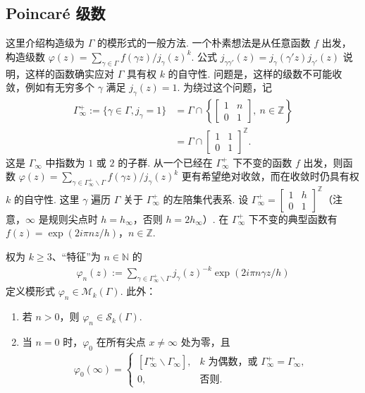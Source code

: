 \subsection{Poincaré 级数}\label{sec:modular-1-2-7}
这里介绍构造级为 $\Gamma$ 的模形式的一般方法. 一个朴素想法是从任意函数 $f$ 出发，构造级数 $\varphi(z)=\sum_{\gamma\in\Gamma}f(\gamma z)/j_\gamma(z)^k$. 公式 $j_{\gamma\gamma'}(z)=j_\gamma(\gamma'z)j_{\gamma'}(z)$ 说明，这样的函数确实应对 $\Gamma$ 具有权 $k$ 的自守性. 问题是，这样的级数不可能收敛，例如有无穷多个 $\gamma$ 满足 $j_\gamma(z)=1$. 为绕过这个问题，记
\begin{align*}
\Gamma_\infty^+:=\{\gamma\in\Gamma,j_\gamma=1\}&=\Gamma\cap\left\{\begin{bmatrix}1&n\\0&1\end{bmatrix},\ n\in\mathbb Z\right\}\\
&=\Gamma\cap\begin{bmatrix}1&1\\0&1\end{bmatrix}^{\mathbb Z}.
\end{align*}
这是 $\Gamma_\infty$ 中指数为 $1$ 或 $2$ 的子群. 从一个已经在 $\Gamma_\infty^+$ 下不变的函数 $f$ 出发，则函数 $\varphi(z)=\sum_{\gamma\in\Gamma_\infty^+\backslash\Gamma}f(\gamma z)/j_\gamma(z)^k$ 更有希望绝对收敛，而在收敛时仍具有权 $k$ 的自守性. 这里 $\gamma$ 遍历 $\Gamma$ 关于 $\Gamma_\infty^+$ 的左陪集代表系.
设 $\Gamma_\infty^+=\left[\begin{smallmatrix}1&h\\0&1\end{smallmatrix}\right]^{\mathbb Z}$（注意，$\infty$ 是规则尖点时 $h=h_\infty$，否则 $h=2h_\infty$）. 在 $\Gamma_\infty^+$ 下不变的典型函数有 $f(z)=\exp(2i\pi nz/h)$，$n\in\mathbb Z$.
\begin{proposition*}
权为 $k\geqslant3$、``特征''为 $n\in\mathbb N$ 的
\begin{align*}
\varphi_n(z):=\sum_{\gamma\in\Gamma_\infty^+\backslash\Gamma}j_\gamma(z)^{-k}\exp(2i\pi n\gamma z/h)
\end{align*}
定义模形式 $\varphi_n\in\mathcal M_k(\Gamma)$. 此外：
\begin{enumerate}[label=\roman*)]
\item 若 $n>0$，则 $\varphi_n\in\mathcal S_k(\Gamma)$.
\item 当 $n=0$ 时，$\varphi_0$ 在所有尖点 $x\ne\infty$ 处为零，且
\begin{align*}
\varphi_0(\infty)=\begin{cases}[\Gamma_\infty^+\backslash\Gamma_\infty],&k\text{ 为偶数，或 }\Gamma_\infty^+=\Gamma_\infty,\\0,&\text{否则}.\end{cases}
\end{align*}
\end{enumerate}
\end{proposition*}
